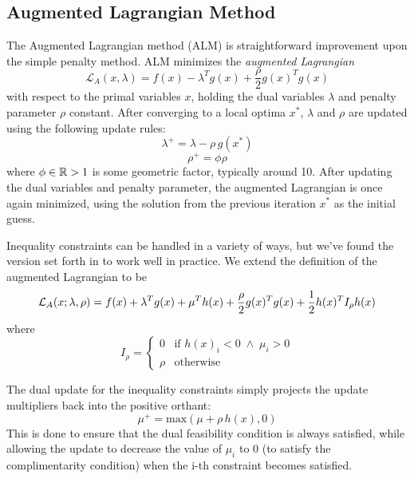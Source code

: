 \documentclass[../root.tex]{subfiles}
\begin{document}
\subsection{Augmented Lagrangian Method} \label{sec:background_alm}
    The Augmented Lagrangian method (ALM) is straightforward improvement upon the 
    simple penalty method. ALM minimizes the \textit{augmented Lagrangian}
    \begin{equation}
        \mathcal{L}_A(x, \lambda) = f(x) - \lambda^T g(x) + \frac{\rho}{2} g(x)^T g(x)
    \end{equation}
    with respect to the primal variables $x$, holding the dual variables $\lambda$ and 
    penalty parameter $\rho$ constant. After converging to a local optima $x^*$, 
    $\lambda$ and $\rho$ are updated using the following update rules:
    \begin{equation} \label{eq:al_dual_update}
        \lambda^+ = \lambda - \rho \, g(x^*)
    \end{equation}
    \begin{equation}
        \rho^+ = \phi \rho
    \end{equation}
    where $\phi \in \mathbb{R} > 1$ is some geometric factor, typically around 10. After updating 
    the dual variables and penalty parameter, the augmented Lagrangian is once again 
    minimized, using the solution from the previous iteration $x^*$ as the initial guess.

    Inequality constraints can be handled in a variety of ways, but we've found
    the version set forth in \cite{toussaint_Novel_2014} to work
    well in practice. We extend the definition of the augmented Lagrangian to be
    \begin{equation}
        \mathcal L_A(x; \lambda, \rho) = f(x) + \lambda^T g(x) + \mu^T h(x) 
            + \frac{\rho}{2} g(x)^T g(x) + \frac{1}{2} h(x)^T I_\rho h(x)
    \end{equation}
    where 
    \begin{equation} \label{eq:penalty_matrix}
        I_\rho = \begin{cases}
            0 & \text{if } h(x)_i < 0 \; \wedge \; \mu_i > 0 \\
            \rho & \text{otherwise}
        \end{cases}
    \end{equation}

    The dual update for the inequality constraints simply projects the update multipliers 
    back into the positive orthant:
    \begin{equation}
        \mu^+ = \text{max}(\mu + \rho \, h(x), 0)
    \end{equation}
    This is done to ensure that the dual feasibility condition is always
    satisfied, while allowing the update to decrease the value of $\mu_i$ to 0
    (to satisfy the complimentarity condition) when the i-th constraint becomes
    satisfied.
\end{document}
